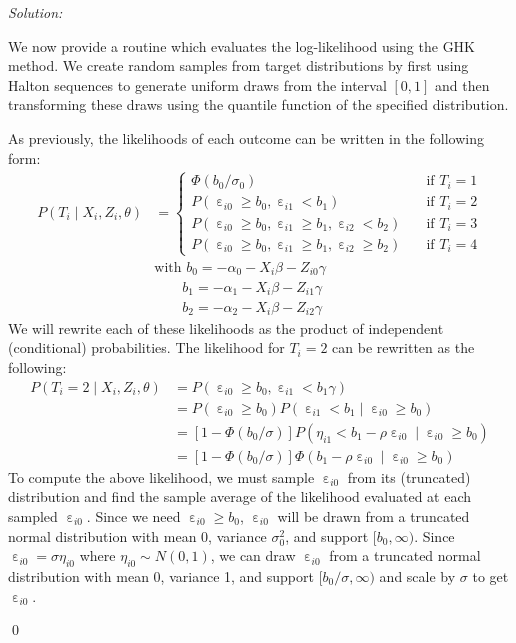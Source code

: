 \documentclass[12pt]{article}
\DeclareMathOperator{\eps}{\varepsilon}
\newenvironment{sol}
    {\emph{Solution:}
    }
    {
    \qed
    }
\begin{document}
\begin{sol}
    We now provide a routine which evaluates the log-likelihood using the GHK method. We create random samples from target distributions by first using Halton sequences to generate uniform draws from the interval $[0,1]$ and then transforming these draws using the quantile function of the specified distribution. 

    As previously, the likelihoods of each outcome can be written in the following form:
    \begin{align*}
        P(T_i \mid X_i, Z_i, \theta) &= \begin{cases}
            \Phi(b_0/\sigma_0) \quad &\text{if } T_i = 1\\
            P( \eps_{i0} \geq b_0,   \eps_{i1} < b_1) \quad &\text{if } T_i = 2\\
            P( \eps_{i0} \geq b_0,  \eps_{i1} \geq b_1, \eps_{i2} < b_2) \quad &\text{if } T_i = 3\\
            P( \eps_{i0} \geq b_0,  \eps_{i1} \geq b_1, \eps_{i2} \geq b_2) \quad &\text{if } T_i = 4
        \end{cases}\\
        &\text{with } b_0 = - \alpha_0 - X_i \beta - Z_{i0}\gamma\\ 
        & \qquad b_1 = - \alpha_1 - X_i \beta - Z_{i1}\gamma\\
        & \qquad b_2 = - \alpha_2 - X_i \beta - Z_{i2}\gamma
    \end{align*}
    We will rewrite each of these likelihoods as the product of independent (conditional) probabilities. The likelihood for $T_i = 2$ can be rewritten as the following:
    \begin{align*} 
        P(T_i = 2 \mid X_i, Z_i, \theta) &= P( \eps_{i0} \geq b_0,   \eps_{i1} < b_1 \gamma) \\
        &=  P(\eps_{i0} \geq b_0) P(\eps_{i1} < b_1 \mid \eps_{i0} \geq b_0)\\
        &= [1-\Phi(b_0/\sigma)] P(\eta_{i1} < b_1 - \rho \eps_{i0} \mid \eps_{i0} \geq b_0)\\
        &= [1-\Phi(b_0/\sigma)] \Phi(b_1 - \rho \eps_{i0} \mid \eps_{i0} \geq b_0)
    \end{align*}
    To compute the above likelihood, we must sample $\eps_{i0}$ from its (truncated) distribution and find the sample average of the likelihood evaluated at each sampled $\eps_{i0}$. Since we need $\eps_{i0} \geq b_0$, $\eps_{i0}$ will be drawn from a truncated normal distribution with mean 0, variance $\sigma_0^2$, and support $[b_0, \infty)$. Since $\eps_{i0} = \sigma \eta_{i0}$ where $\eta_{i0} \sim N(0,1)$, we can draw $\eps_{i0}$ from a truncated normal distribution with mean 0, variance 1, and support $[b_0/\sigma, \infty)$ and scale by $\sigma$ to get $\eps_{i0}$. 


\end{sol}
\end{document}
